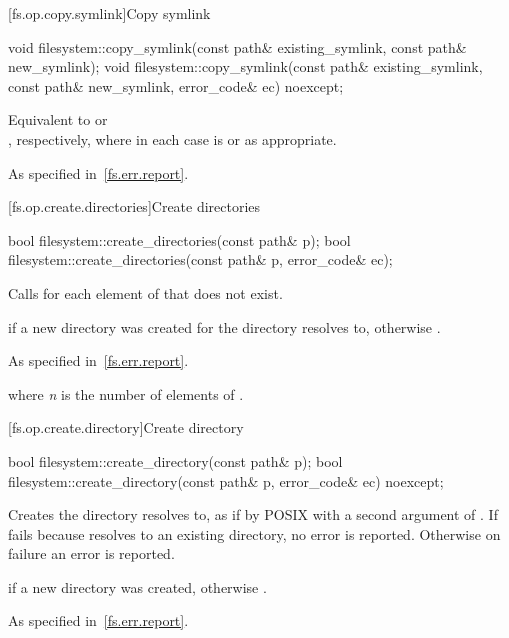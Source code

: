 [fs.op.copy.symlink]{Copy symlink}

%
\begin{itemdecl}
void filesystem::copy_symlink(const path& existing_symlink, const path& new_symlink);
void filesystem::copy_symlink(const path& existing_symlink, const path& new_symlink,
                  error_code& ec) noexcept;
\end{itemdecl}

\begin{itemdescr}
\pnum
\effects
Equivalent to
 or\\
, respectively,
  where in each case  is  or
   as appropriate.

\pnum
\throws
As specified in~\ref{fs.err.report}.
\end{itemdescr}


[fs.op.create.directories]{Create directories}

%
\begin{itemdecl}
bool filesystem::create_directories(const path& p);
bool filesystem::create_directories(const path& p, error_code& ec);
\end{itemdecl}

\begin{itemdescr}
\pnum
\effects
Calls  for each element of 
  that does not exist.

\pnum
\returns
{} if a new directory was created
  for the directory  resolves to,
  otherwise .

\pnum
\throws
As specified in~\ref{fs.err.report}.

\pnum
\complexity
{} where \textit{n} is the number of elements
  of .
\end{itemdescr}


[fs.op.create.directory]{Create directory}

%
\begin{itemdecl}
bool filesystem::create_directory(const path& p);
bool filesystem::create_directory(const path& p, error_code& ec) noexcept;
\end{itemdecl}

\begin{itemdescr}
\pnum
\effects
Creates the directory  resolves to,
  as if by POSIX  with a second argument of
  .
  If  fails because  resolves to an existing directory,
  no error is reported. Otherwise on failure an error is reported.

\pnum
\returns
{} if a new directory was created, otherwise .

\pnum
\throws
As specified in~\ref{fs.err.report}.
\end{itemdescr}


